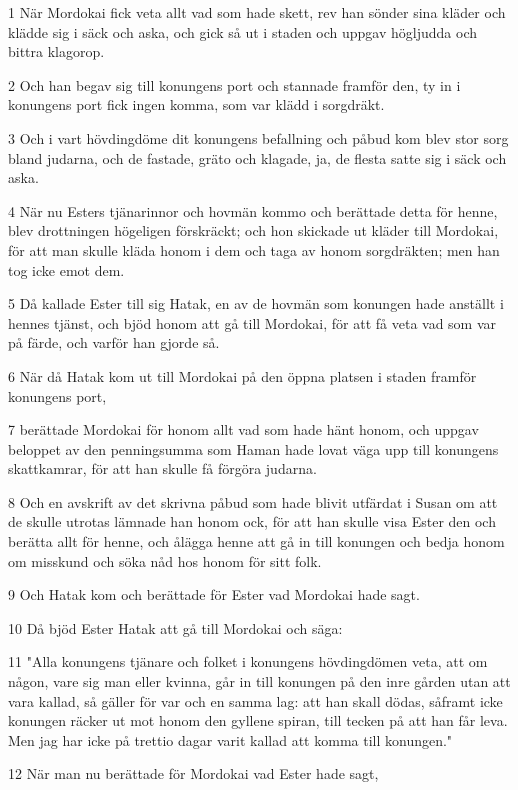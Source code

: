 \par 1 När Mordokai fick veta allt vad som hade skett, rev han sönder sina kläder och klädde sig i säck och aska, och gick så ut i staden och uppgav högljudda och bittra klagorop.
\par 2 Och han begav sig till konungens port och stannade framför den, ty in i konungens port fick ingen komma, som var klädd i sorgdräkt.
\par 3 Och i vart hövdingdöme dit konungens befallning och påbud kom blev stor sorg bland judarna, och de fastade, gräto och klagade, ja, de flesta satte sig i säck och aska.
\par 4 När nu Esters tjänarinnor och hovmän kommo och berättade detta för henne, blev drottningen högeligen förskräckt; och hon skickade ut kläder till Mordokai, för att man skulle kläda honom i dem och taga av honom sorgdräkten; men han tog icke emot dem.
\par 5 Då kallade Ester till sig Hatak, en av de hovmän som konungen hade anställt i hennes tjänst, och bjöd honom att gå till Mordokai, för att få veta vad som var på färde, och varför han gjorde så.
\par 6 När då Hatak kom ut till Mordokai på den öppna platsen i staden framför konungens port,
\par 7 berättade Mordokai för honom allt vad som hade hänt honom, och uppgav beloppet av den penningsumma som Haman hade lovat väga upp till konungens skattkamrar, för att han skulle få förgöra judarna.
\par 8 Och en avskrift av det skrivna påbud som hade blivit utfärdat i Susan om att de skulle utrotas lämnade han honom ock, för att han skulle visa Ester den och berätta allt för henne, och ålägga henne att gå in till konungen och bedja honom om misskund och söka nåd hos honom för sitt folk.
\par 9 Och Hatak kom och berättade för Ester vad Mordokai hade sagt.
\par 10 Då bjöd Ester Hatak att gå till Mordokai och säga:
\par 11 "Alla konungens tjänare och folket i konungens hövdingdömen veta, att om någon, vare sig man eller kvinna, går in till konungen på den inre gården utan att vara kallad, så gäller för var och en samma lag: att han skall dödas, såframt icke konungen räcker ut mot honom den gyllene spiran, till tecken på att han får leva. Men jag har icke på trettio dagar varit kallad att komma till konungen."
\par 12 När man nu berättade för Mordokai vad Ester hade sagt,
